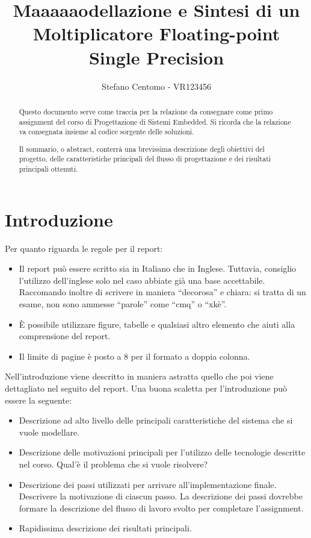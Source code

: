 \documentclass[]{IEEEtran}
\title{Maaaaaodellazione e Sintesi di un Moltiplicatore Floating-point Single Precision}
\author{Stefano Centomo - VR123456}
\begin{document}
\maketitle

\begin{abstract}
Questo documento serve come traccia per la relazione da consegnare come primo assignment del corso di Progettazione di Sistemi Embedded. Si ricorda che la relazione va consegnata insieme al codice sorgente delle soluzioni.

Il sommario, o abstract, conterr\`a una brevissima descrizione degli obiettivi del progetto, delle caratteristiche principali del flusso di progettazione e dei risultati principali ottenuti. 
\end{abstract}


\section{Introduzione}

Per quanto riguarda le regole per il report:
\begin{itemize}
\item Il report pu\`o essere scritto sia in Italiano che in Inglese. Tuttavia, consiglio l'utilizzo dell'inglese solo nel caso abbiate gi\`a una base accettabile. Raccomando inoltre di scrivere in maniera ``decorosa'' e chiara: si tratta di un esame, non sono ammesse ``parole'' come ``cmq'' o ``xk\`e''.
\item \`E possibile utilizzare figure, tabelle e qualsiasi altro elemento che aiuti alla comprensione del report.

\item Il limite di pagine \`e posto a 8 per il formato a doppia colonna.
\end{itemize}

Nell'introduzione viene descritto in maniera astratta quello che poi viene dettagliato nel seguito del report. Una buona scaletta per l'introduzione pu\`o essere la seguente:
\begin{itemize}
\item Descrizione ad alto livello delle principali caratteristiche del sistema che si vuole modellare.
\item Descrizione delle motivazioni principali per l'utilizzo delle tecnologie descritte nel corso. Qual'\`e il problema che si vuole risolvere?
\item Descrizione dei passi utilizzati per arrivare all'implementazione finale. Descrivere la motivazione di ciascun passo. La descrizione dei passi dovrebbe formare la descrizione del flusso di lavoro svolto per completare l'assignment.
\item Rapidissima descrizione dei risultati principali.
\end{itemize}
\end{document}
